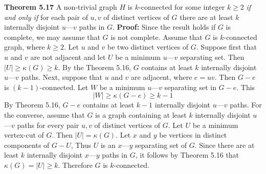 \nopagenumbers
{\bf Theorem 5.17}
\vskip 6pt
A non-trivial graph $H$ is $k$-connected for some integer $k \geq 2$ {\it if and only if} for each pair of $u,v$ of distinct vertices of $G$ there are at least $k$ internally disjoint $u$---$v$ paths in $G$.
\vskip 10pt
{\bf Proof:}
\vskip 6pt
Since the result holds if $G$ is complete, we may assume that $G$ is not complete. Assume that $G$ is  $k$-connected graph, where $k \geq 2$. Let $u$ and $v$ be two distinct vertices of $G$. Suppose first that $u$ and $v$ are not adjacent and let $U$ be a minimum $u$---$v$ separating set. Then $|U| \geq \kappa (G) \geq k$. By the Theorem 5.16, $G$ contains at least $k$ internally disjoint $u$---$v$ paths. Next, suppose that $u$ and $v$ are adjacent, where $e=uv$. Then $G-e$ is $(k-1)$-connected. Let $W$ be a minimum $u$---$v$ separating set in $G-e$. This $$|W| \geq \kappa (G-e) \geq k-1$$ By Theorem 5.16, $G-e$ contains at least $k-1$ internally disjoint $u$---$v$ paths.
\vskip 1mm
For the converse, assume that $G$ is a graph containing at least $k$ internally disjoint $u$---$v$ paths for every pair $u,v$ of distinct vertices of $G$. Let $U$ be a minimum vertex-cut of $G$. Then $|U|= \kappa (G)$. Let $x$ and $y$ be vertices in distinct components of $G-U$, Thus $U$ is an $x$---$y$ separating set of $G$. Since there are at least $k$ internally disjoint $x$---$y$ paths in $G$, it follows by Theorem 5.16 that $\kappa (G)=|U| \geq k$. Therefore $G$ is $k$-connected.

\vfill\eject
